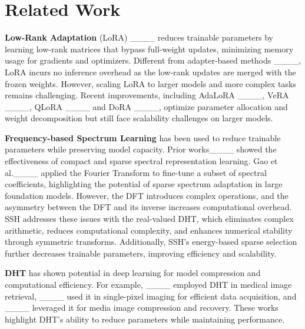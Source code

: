 \section{Related Work}
\noindent \textbf{Low-Rank Adaptation} (LoRA) ____ reduces trainable parameters by learning low-rank matrices that bypass full-weight updates, minimizing memory usage for gradients and optimizers. 
Different from adapter-based methods ____, LoRA incurs no inference overhead as the low-rank updates are merged with the frozen weights. However, scaling LoRA to larger models and more complex tasks remains challenging.
Recent improvements, including AdaLoRA ____, VeRA ____, QLoRA ____ and DoRA ____, optimize parameter allocation and weight decomposition but still face scalability challenges on larger models. 


\noindent \textbf{Frequency-based Spectrum Learning} has been used to reduce trainable parameters while preserving model capacity. Prior works____ showed the effectiveness of compact and sparse spectral representation learning. Gao et al.____ applied the Fourier Transform to fine-tune a subset of spectral coefficients, highlighting the potential of sparse spectrum adaptation in large foundation models. However, the DFT introduces complex operations, and the asymmetry between the DFT and its inverse increases computational overhead.
SSH addresses these issues with the real-valued DHT, which eliminates complex arithmetic, reduces computational complexity, and enhances numerical stability through symmetric transforms. Additionally, SSH’s energy-based sparse selection further decreases trainable parameters, improving efficiency and scalability.




\noindent \textbf{DHT} has shown potential in deep learning for model compression and computational efficiency. For example, ____ employed DHT in medical image retrieval, ____ used it in single-pixel imaging for efficient data acquisition, and ____ leveraged it for media image compression and recovery. These works highlight DHT’s ability to reduce parameters while maintaining performance. 
